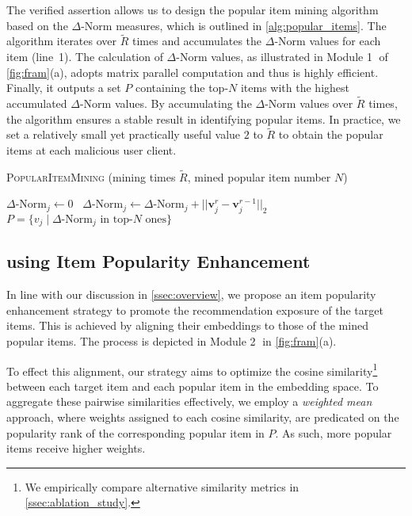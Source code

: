 The verified assertion allows us to design the popular item mining algorithm based on the $\Delta$-Norm measures, which is outlined in \cref{alg:popular_items}.
The algorithm iterates over $\tilde{R}$ times and accumulates the $\Delta$-Norm values for each item (line~1). 
The calculation of $\Delta$-Norm values, as illustrated in Module \textcircled{1} of \cref{fig:fram}(a), adopts matrix parallel computation and thus is highly efficient.
%
Finally, it outputs a set $P$ containing the top-$N$ items with the highest accumulated $\Delta$-Norm values. By accumulating the $\Delta$-Norm values over $\tilde{R}$ times, the algorithm ensures a stable result in identifying popular items.
In practice, we set a relatively small yet practically useful value $2$ to $\tilde{R}$ to obtain the popular items at each malicious user client.

\begin{algorithm}[!htbp]
\caption{\textsc{PopularItemMining} (mining times $\tilde{R}$, mined popular item number $N$)}
\label{alg:popular_items}
\begin{algorithmic}[1]
            $\Delta\text{-Norm}_j \gets 0$
        \Else
            ~$\Delta\text{-Norm}_j \gets \Delta\text{-Norm}_j + ||\mathbf{v}_j^{r}-\mathbf{v}_j^{r-1}||_2$
        \EndIf
    \EndFor
\EndWhile
\State \Return ${P} = \{ v_j \mid \Delta\text{-Norm}_j \text{ in top-$N$ ones} \}$
\end{algorithmic}
\end{algorithm}


\subsection{\modelI{} using Item Popularity Enhancement}
\label{ssec:popular_enhancement}

In line with our discussion in \cref{ssec:overview}, we propose an item popularity enhancement strategy to promote the recommendation exposure of the target items. This is achieved by aligning their embeddings to those of the mined popular items.
The process is depicted in Module \textcircled{2} in \cref{fig:fram}(a).

To effect this alignment, our strategy aims to optimize the {cosine similarity}\footnote{We empirically compare alternative similarity metrics in \cref{ssec:ablation_study}.} between each target item and each popular item in the embedding space. 
To aggregate these pairwise similarities effectively, we employ a \emph{weighted mean} approach, where weights assigned to each cosine similarity, are predicated on the popularity rank of the corresponding popular item in ${P}$. As such, more popular items receive higher weights.

